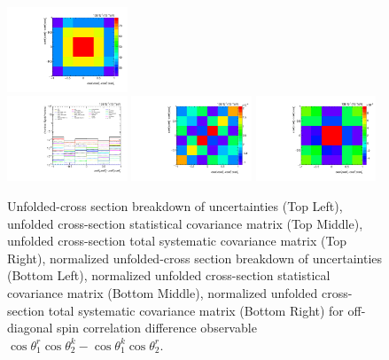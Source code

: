 \begin{refsection}
\begin{figure}[htb]
\begin{center}
 \includegraphics[width=0.32\textwidth]{fig_fullRun2UL/unfolding/combined/TotalSystCovMatrix_rebinnedB_c_Mrk.pdf} \\
 \includegraphics[width=0.32\textwidth]{fig_fullRun2UL/unfolding/combined/deltaSystCombinedlogNorm_rebinnedB_c_Mrk.pdf}
 \includegraphics[width=0.32\textwidth]{fig_fullRun2UL/unfolding/combined/StatCovMatrixNorm_rebinnedB_c_Mrk.pdf}
 \includegraphics[width=0.32\textwidth]{fig_fullRun2UL/unfolding/combined/TotalSystCovMatrixNorm_rebinnedB_c_Mrk.pdf} \\
\caption{Unfolded-cross section breakdown of uncertainties (Top Left), unfolded cross-section statistical covariance matrix (Top Middle), unfolded cross-section total systematic covariance matrix (Top Right), normalized unfolded-cross section breakdown of uncertainties (Bottom Left), normalized unfolded cross-section statistical covariance matrix (Bottom Middle), normalized unfolded cross-section total systematic covariance matrix (Bottom Right) for off-diagonal spin correlation difference observable $\cos\theta_{1}^{r}\cos\theta_{2}^{k}-\cos\theta_{1}^{k}\cos\theta_{2}^{r}$.}
\label{fig:c_Mrk_uncertainties}
\end{center}
\end{figure}

\end{refsection}
